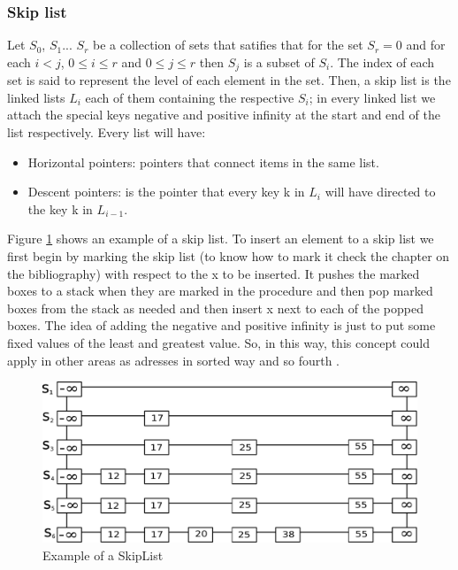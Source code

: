 \documentclass{sig-alternate-05-2015}
\begin{document}
    \subsubsection{Skip list}
      Let $S_{0}$, $S_{1}$... $S_r$ be a collection of sets that satifies that for the set $S_r = 0$ and for each $i<j$, $0\leq i \leq r$ and $0\leq j\leq r$ then
      $S_j$ is a subset of $S_i$. The index of each set is said to represent the level of each element in the set. Then, a skip list
      is the linked lists $L_i$ each of them containing the respective $S_i$; in every linked list we attach the special keys negative
      and positive infinity at the start and end of the list respectively. Every list will have:
      \begin{itemize}
        \item Horizontal pointers: pointers that connect items in the same list.
        \item Descent pointers: is the pointer that every key k in $L_i$ will have directed to the key k in $L_{i-1}$.
      \end{itemize}
      Figure \ref{img:skipList} shows an example of a skip list.
      To insert an element to a skip list we first begin by marking the skip list (to know how to mark it check the chapter on
      the bibliography) with respect to the x to be inserted. It pushes the marked boxes to a stack when they are
      marked in the procedure and then pop marked boxes from the stack as needed and then insert x next to each of the popped
      boxes.
      The idea of adding the negative and positive infinity is just to put some fixed values of the least and greatest
      value. So, in this way, this concept could apply in other areas as adresses in sorted way and so fourth \cite{Mehta:Handbook}.
      \begin{figure}
        \centering
        \includegraphics[scale=0.4]{SkipList.pdf}
        \caption{Example of a SkipList}
        \label{img:skipList}
      \end{figure}

  
  
\end{document}
